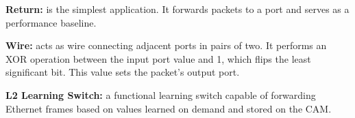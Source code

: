 \begin{table}[t]
\centering
\caption{eBPF programs used during experiments.}
\label{tbl:example-sizes}
\end{table}

\textbf{Return:} is the simplest application. It forwards packets to a port and serves as a performance baseline. 

\textbf{Wire:} acts as wire connecting adjacent ports in pairs of two. It performs an XOR operation between the input port value and 1, which flips the least significant bit. This value sets the packet's output port.

\textbf{L2 Learning Switch:} a functional learning switch capable of forwarding Ethernet frames based on values learned on demand and stored on the CAM.


